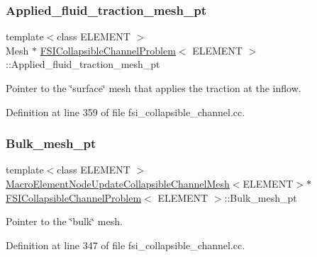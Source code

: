 \subsubsection{\texorpdfstring{Applied\+\_\+fluid\+\_\+traction\+\_\+mesh\+\_\+pt}{Applied\_fluid\_traction\_mesh\_pt}}
{\footnotesize\ttfamily template$<$class E\+L\+E\+M\+E\+NT $>$ \\
Mesh $\ast$ \hyperlink{classFSICollapsibleChannelProblem}{F\+S\+I\+Collapsible\+Channel\+Problem}$<$ E\+L\+E\+M\+E\+NT $>$\+::Applied\+\_\+fluid\+\_\+traction\+\_\+mesh\+\_\+pt\hspace{0.3cm}{\ttfamily [private]}}



Pointer to the \char`\"{}surface\char`\"{} mesh that applies the traction at the inflow. 



Definition at line 359 of file fsi\+\_\+collapsible\+\_\+channel.\+cc.

\mbox{\label{classFSICollapsibleChannelProblem_ab2eb47a9ed4ce8adb3b11ac316644cde}} 
\subsubsection{\texorpdfstring{Bulk\+\_\+mesh\+\_\+pt}{Bulk\_mesh\_pt}\hspace{0.1cm}{\footnotesize\ttfamily [1/6]}}
{\footnotesize\ttfamily template$<$class E\+L\+E\+M\+E\+NT $>$ \\
\hyperlink{classoomph_1_1MacroElementNodeUpdateCollapsibleChannelMesh}{Macro\+Element\+Node\+Update\+Collapsible\+Channel\+Mesh}$<$E\+L\+E\+M\+E\+NT$>$$\ast$ \hyperlink{classFSICollapsibleChannelProblem}{F\+S\+I\+Collapsible\+Channel\+Problem}$<$ E\+L\+E\+M\+E\+NT $>$\+::Bulk\+\_\+mesh\+\_\+pt\hspace{0.3cm}{\ttfamily [private]}}



Pointer to the \char`\"{}bulk\char`\"{} mesh. 



Definition at line 347 of file fsi\+\_\+collapsible\+\_\+channel.\+cc.

\mbox{\label{classFSICollapsibleChannelProblem_a74c09286f4ad4242c37b6ea16c069fae}} 
